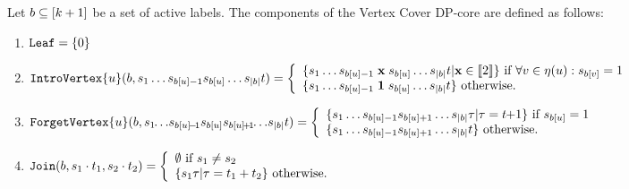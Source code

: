 \begin{definition} \label{VCDP-core}
Let $b \subseteq [k+1]$ be a set of active labels. The components of the {\sc Vertex Cover} DP-core are defined as follows:
\begin{enumerate}

\item \label{VCDP-coreLeaf}$\texttt{Leaf} = \{0\}$

\item \label{VCDP-coreIntroVertex}$\texttt{IntroVertex}\{u\}(b,s_1\dots s_{b[u]-1}s_{b[u]}\dots s_{|b|} t)
\\ = 
\left\{\begin{array}{l}
\{s_1\dots s_{b[u]-1}\thickspace\textbf{x}\thickspace s_{b[u]}\dots s_{|b|} t | \textbf{x} \in \llbracket 2 \rrbracket\} \mbox{ if $\forall v \in \eta(u): s_{b[v]} = 1$} \\
\{s_1\dots s_{b[u]-1}\thickspace\textbf{1}\thickspace s_{b[u]}\dots s_{|b|} t\} \mbox{ otherwise.} 
\end{array}\right. $

\item \label{VCDP-coreForgetVertex}$\forgetvertex{\activelabelu}(\activelabels,s_1\negthickspace\dots\negthinspace s_{\activelabels[\activelabelu]\negthinspace-\negthinspace1}s_{\activelabels[\activelabelu]}s_{\activelabels[\activelabelu]\negthinspace+\negthinspace1}\negthickspace\dots\negthinspace s_{|\activelabels|} t) \\ = 
\left\{\begin{array}{l}
\{s_1\dots s_{\activelabels[\activelabelu]-1}s_{\activelabels[\activelabelu]+1}\dots s_{|\activelabels|} \tau | \tau = t\negthickspace+\negmedspace1\} \mbox{ if $s_{\activelabels[\activelabelu]} = 1$} \\
\{s_1\dots s_{\activelabels[\activelabelu]-1}s_{\activelabels[\activelabelu]+1}\dots s_{|\activelabels|} t\} \mbox{ otherwise.} 
\end{array}\right. $


\item \label{VCDP-coreJoin}$\texttt{Join}(b, s_1\cdot t_1,s_2\cdot t_2) \\= \left\{
\begin{array}{l}
\emptyset \mbox{ if $s_1\neq s_2$} \\ 
\{s_1\tau | \tau = t_1 + t_2\} \mbox{ otherwise.} 
\end{array}\right.$

\end{enumerate}

\end{definition}



